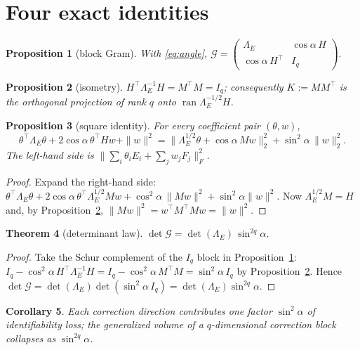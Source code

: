 \documentclass[11pt]{article}
\newtheorem{theorem}{Theorem}[section]
\newtheorem{proposition}[theorem]{Proposition}
\newtheorem{corollary}[theorem]{Corollary}
\theoremstyle{remark}
\newcommand{\Gr}{\mathcal{G}}
\newcommand{\Le}{\Lambda_E}
\begin{document}
\section{Four exact identities}\label{sec:identities}

\begin{proposition}[block Gram]\label{prop:block}
With \eqref{eq:angle},
$\Gr=\begin{pmatrix}\Le & \cos\alpha\,H\\ \cos\alpha\,H^{\top} & I_q\end{pmatrix}.$
\end{proposition}

\begin{proposition}[isometry]\label{prop:isometry}
$H^{\top}\Le^{-1}H=M^{\top}M=I_q$; consequently $K:=MM^{\top}$ is the orthogonal
projection of rank $q$ onto $\operatorname{ran}\Le^{-1/2}H$.
\end{proposition}

\begin{proposition}[square identity]\label{prop:square}
For every coefficient pair $(\theta,w)$,
\begin{equation}\label{eq:square}
  \theta^{\top}\Le\theta+2\cos\alpha\,\theta^{\top}Hw+\|w\|^2
  =\bigl\|\Le^{1/2}\theta+\cos\alpha\,Mw\bigr\|_2^2+\sin^2\alpha\,\|w\|_2^2 .
\end{equation}
The left-hand side is $\|\sum_i\theta_iE_i+\sum_jw_jF_j\|_F^2$.
\end{proposition}

\begin{proof}
Expand the right-hand side: $\theta^{\top}\Le\theta+2\cos\alpha\,\theta^{\top}\Le^{1/2}
Mw+\cos^2\alpha\,\|Mw\|^2+\sin^2\alpha\|w\|^2$. Now $\Le^{1/2}M=H$ and, by
Proposition~\ref{prop:isometry}, $\|Mw\|^2=w^{\top}M^{\top}Mw=\|w\|^2$.
\end{proof}

\begin{theorem}[determinant law]\label{thm:det}
$\det\Gr=\det(\Le)\,\sin^{2q}\alpha$.
\end{theorem}

\begin{proof}
Take the Schur complement of the $I_q$ block in Proposition~\ref{prop:block}:
$I_q-\cos^2\alpha\,H^{\top}\Le^{-1}H=I_q-\cos^2\alpha\,M^{\top}M=\sin^2\alpha\,I_q$ by
Proposition~\ref{prop:isometry}. Hence
$\det\Gr=\det(\Le)\det(\sin^2\alpha\,I_q)=\det(\Le)\sin^{2q}\alpha$.
\end{proof}

\begin{corollary}\label{cor:volume}
Each correction direction contributes one factor $\sin^2\alpha$ of identifiability loss;
the generalized volume of a $q$-dimensional correction block collapses as
$\sin^{2q}\alpha$.
\end{corollary}
\end{document}
